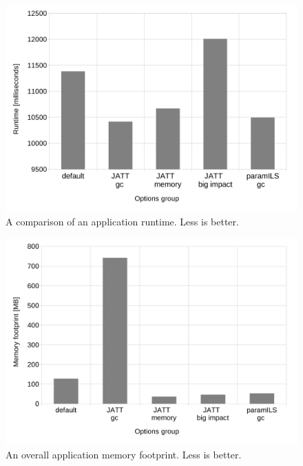 \documentclass[
  digital, %
  oneside,
  notable, %
  nolof,     %
  nolot     %
]{fithesis3}
\begin{document}
\begin{figure}[h]
	\centering
	\includegraphics[width=13cm]{fig/runtimeBiggerFont.pdf}
	\caption{A comparison of an application runtime. Less is better.}
	\label{runtime}
\end{figure}

\begin{figure}[h]
	\centering
	\includegraphics[width=13cm]{fig/footprintBiggerFont.pdf}
	\caption{An overall application memory footprint. Less is better.}
	\label{footprint}
\end{figure}

\clearpage



\appendix
\end{document}
